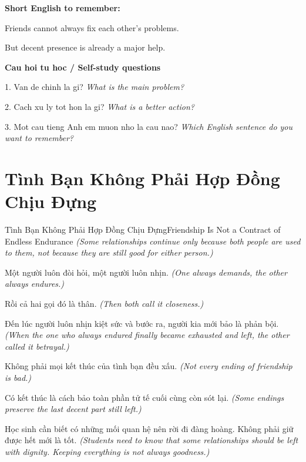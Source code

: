 \begin{ghinhoanh}
\textbf{Short English to remember:}

Friends cannot always fix each other’s problems.

But decent presence is already a major help.

\end{ghinhoanh}

\begin{tuhocnhanh}
\textbf{Cau hoi tu hoc / Self-study questions}

1. Van de chinh la gi? \textit{What is the main problem?}

2. Cach xu ly tot hon la gi? \textit{What is a better action?}

3. Mot cau tieng Anh em muon nho la cau nao? \textit{Which English sentence do you want to remember?}
\end{tuhocnhanh}
\ngancach

\section{Tình Bạn Không Phải Hợp Đồng Chịu Đựng}
\begin{truyen}{Tình Bạn Không Phải Hợp Đồng Chịu Đựng}{Friendship Is Not a Contract of Endless Endurance}
\textit{(Some relationships continue only because both people are used to them, not because they are still good for either person.)}

Một người luôn đòi hỏi, một người luôn nhịn.
\textit{(One always demands, the other always endures.)}

Rồi cả hai gọi đó là thân.
\textit{(Then both call it closeness.)}

Đến lúc người luôn nhịn kiệt sức và bước ra, người kia mới bảo là phản bội.
\textit{(When the one who always endured finally became exhausted and left, the other called it betrayal.)}

Không phải mọi kết thúc của tình bạn đều xấu.
\textit{(Not every ending of friendship is bad.)}

Có kết thúc là cách bảo toàn phần tử tế cuối cùng còn sót lại.
\textit{(Some endings preserve the last decent part still left.)}

\end{truyen}

\begin{baihoc}
Học sinh cần biết có những mối quan hệ nên rời đi đàng hoàng. Không phải giữ được hết mới là tốt.
\textit{(Students need to know that some relationships should be left with dignity. Keeping everything is not always goodness.)}
\end{baihoc}


